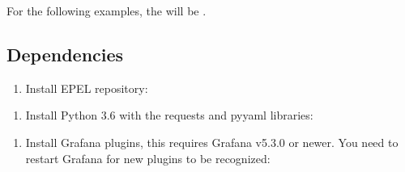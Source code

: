 \documentclass[letterpaper,10pt,english]{sphinxmanual}
\begin{document}
For the following examples, the  will be .


\subsection{Dependencies}
\label{\detokenize{readme:dependencies}}\begin{enumerate}
\def\theenumi{\arabic{enumi}}
\def\labelenumi{\theenumi .}
\makeatletter\def\p@enumii{\p@enumi \theenumi .}\makeatother
\item {} 
Install EPEL repository:

\begin{sphinxVerbatim}[commandchars=\\\{\}]
   
\end{sphinxVerbatim}

\end{enumerate}
\begin{enumerate}
\def\theenumi{\arabic{enumi}}
\def\labelenumi{\theenumi .}
\makeatletter\def\p@enumii{\p@enumi \theenumi .}\makeatother
\setcounter{enumi}{1}
\item {} 
{\hyperref[\detokenize{readme:r1}]{}} Install Python 3.6 with the requests and pyyaml libraries:

\begin{sphinxVerbatim}[commandchars=\\\{\}]
    
  
   
  
\end{sphinxVerbatim}

\end{enumerate}
\begin{enumerate}
\def\theenumi{\arabic{enumi}}
\def\labelenumi{\theenumi .}
\makeatletter\def\p@enumii{\p@enumi \theenumi .}\makeatother
\setcounter{enumi}{2}
\item {} 
Install Grafana plugins, this requires Grafana v5.3.0 or newer. You need to
restart Grafana for new plugins to be recognized:

\begin{sphinxVerbatim}[commandchars=\\\{\}]
   
\end{sphinxVerbatim}

\end{enumerate}
\end{document}
